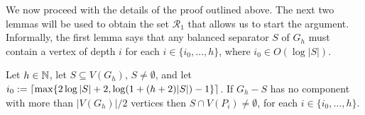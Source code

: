 \documentclass{patmorin}
\renewcommand{\le}{\leqslant}
\renewcommand{\ge}{\geqslant}
\begin{document}
%
%
%
%

We now proceed with the details of the proof outlined above.  The next two lemmas will be used to obtain the set $\mathcal{R}_1$ that allows us to start the argument.  Informally, the first lemma says that any balanced separator $S$ of $G_h$ must contain a vertex of depth $i$ for each $i\in\{i_0,\ldots,h\}$, where $i_0\in O(\log|S|)$.

\begin{lem}\label{small_depth_separator}
  Let $h\in\mathbb{N}$, let $S\subseteq V(G_h)$, $S\neq\emptyset$, and let $i_0:={\lceil \max\{2\log|S|+2, \log(1+(h+2)|S|)-1\} \rceil}$.  If $G_h-S$ has no component with more than $|V(G_h)|/2$ vertices then $S\cap V(P_i)\neq\emptyset$, for each $i\in\{i_0,\ldots,h\}$.
\end{lem}
\end{document}
